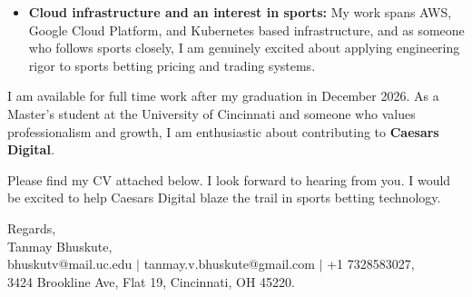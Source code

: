 \documentclass[11pt]{letter}
\begin{document}
\begin{letter}{}
\begin{itemize}[leftmargin=*, itemsep=0.45em]
    \item \textbf{Cloud infrastructure and an interest in sports:} My work spans AWS, Google Cloud Platform, and Kubernetes based infrastructure, and as someone who follows sports closely, I am genuinely excited about applying engineering rigor to sports betting pricing and trading systems.
\end{itemize}

I am available for full time work after my graduation in December 2026. As a Master's student at the University of Cincinnati and someone who values professionalism and growth, I am enthusiastic about contributing to \textbf{Caesars Digital}.

Please find my CV attached below. I look forward to hearing from you. I would be excited to help Caesars Digital blaze the trail in sports betting technology.

{\setlength{\parskip}{0pt}
Regards,\\
Tanmay Bhuskute,\\
bhuskutv@mail.uc.edu $\mid$ tanmay.v.bhuskute@gmail.com $\mid$ +1 7328583027,\\
3424 Brookline Ave, Flat 19, Cincinnati, OH 45220.
}

\end{letter}
\end{document}
